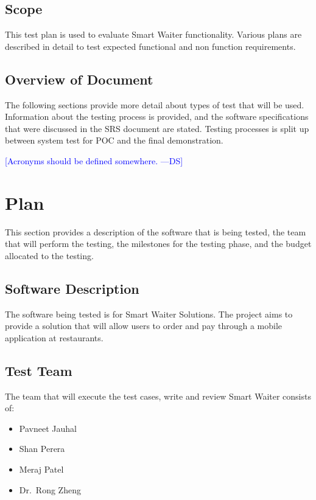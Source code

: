 \documentclass[12pt]{article}
\newcommand{\authornote}[3]{\textcolor{#1}{[#3 ---#2]}}
\newcommand{\authornote}[3]{}
\newcommand{\ds}[1]{\authornote{blue}{DS}{#1}}
\begin{document}
\subsection{Scope}
This test plan is used to evaluate Smart Waiter functionality. Various plans are described in detail to test expected functional and non function requirements.  

\subsection{Overview of Document }
The following sections provide more detail about types of test that will be used. Information about the testing process is provided, and the software specifications
that were discussed in the SRS document are stated. Testing processes is split up between system test for POC and the final demonstration. 

\ds{Acronyms should be defined somewhere.}

%
%

\section{Plan}
This section provides a description of the software that is being tested, the team that will
perform the testing, the milestones for the testing phase, and the budget allocated to the testing. 

\subsection{Software Description}
The software being tested is for Smart Waiter Solutions. The project aims to provide a solution that will allow users to order and pay through a mobile application at restaurants. 

\subsection{Test Team} 
The team that will execute the test cases, write and review Smart Waiter consists of:

\begin{itemize}
 \item Pavneet Jauhal
 \item Shan Perera
 \item Meraj Patel
 \item Dr.\ Rong Zheng
\end{itemize}  
\end{document}
